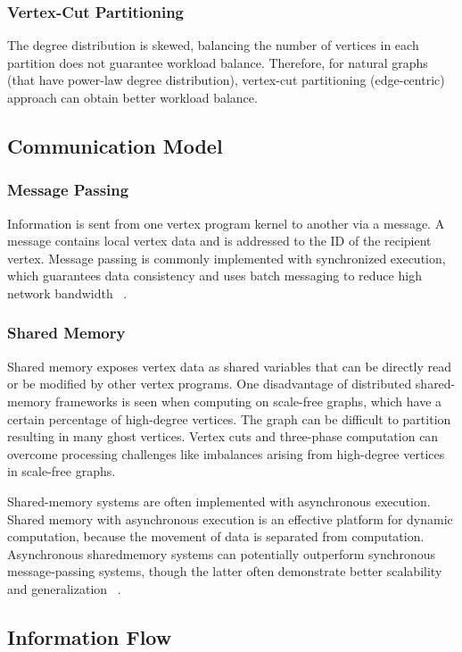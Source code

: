 \documentclass[UTF8,12pt,a4paper]{article}
\begin{document}
\subsubsection{Vertex-Cut Partitioning}
The degree distribution is skewed,
balancing the number of vertices in each partition does not guarantee workload balance.
Therefore, for natural graphs (that have power-law degree distribution),
vertex-cut partitioning (edge-centric) approach can obtain better workload balance.

\subsection{Communication Model}
\subsubsection{Message Passing}
Information is sent from one vertex program kernel to another via a message.
A message contains local vertex data and is addressed to the ID of the recipient vertex.
Message passing is commonly implemented with synchronized execution,
which guarantees data consistency and uses batch messaging to reduce high network bandwidth
~\cite{DBLP:journals/csur/McCuneWM15}.
\subsubsection{Shared Memory}
Shared memory exposes vertex data as shared variables
that can be directly read or be modified by other vertex programs.
One disadvantage of distributed shared-memory frameworks is seen
when computing on scale-free graphs, which have a certain percentage of high-degree vertices.
The graph can be difficult to partition resulting in many ghost vertices.
Vertex cuts and three-phase computation can overcome processing challenges
like imbalances arising from high-degree vertices in scale-free graphs.

Shared-memory systems are often implemented with asynchronous execution.
Shared memory with asynchronous execution is an effective platform for dynamic computation,
because the movement of data is separated from computation.
Asynchronous sharedmemory systems can potentially outperform
synchronous message-passing systems,
though the latter often demonstrate better scalability and generalization
~\cite{DBLP:journals/csur/McCuneWM15}.

\subsection{Information Flow}
\end{document}
